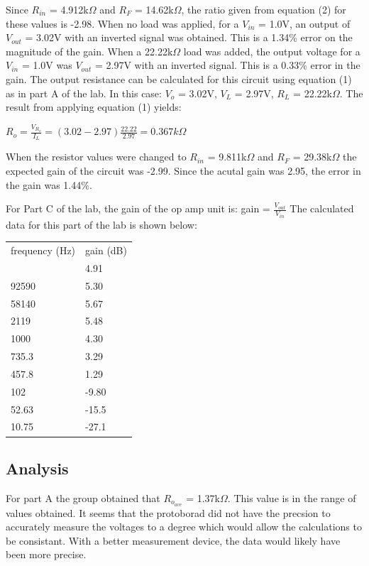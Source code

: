 \documentclass[twocolumn, amsmath]{revtex4}
\begin{document}
Since $R_{in}$ = 4.912k$\Omega$ and $R_{F}$ = 14.62k$\Omega$, the ratio given from equation (2) for these values is -2.98. When no load was applied, for a $V_{in}$ = 1.0V, an output of $V_{out}$ = 3.02V with an inverted signal was obtained. This is a 1.34\% error on the magnitude of the gain. When a 22.22k$\Omega$ load was added, the output voltage for a $V_{in}$ = 1.0V was $V_{out}$ = 2.97V with an inverted signal. This is a 0.33\% error in the gain. The output resistance can be calculated for this circuit using equation (1) as in part A of the lab. In this case: $V_{o}$ = 3.02V, $V_{L}$ = 2.97V, $R_{L}$ = 22.22k$\Omega$. The result from applying equation (1) yields: 

$R_{o} =  \frac{V_{R_{o}}}{I_{L}} = (3.02 - 2.97)\frac{22.22}{2.97} = 0.367k\Omega$

When the resistor values were changed to $R_{in}$ = 9.811k$\Omega$ and $R_{F}$ = 29.38k$\Omega$ the expected gain of the circuit was -2.99. Since the acutal gain was 2.95, the error in the gain was 1.44\%. 

For Part C of the lab, the gain of the op amp unit is: gain = $\frac{V_{out}}{V_{in}}$ The calculated data for this part of the lab is shown below:

\begin{center}
	\begin{ruledtabular}
    \begin{tabular}{ l l }
	frequency (Hz) & gain (dB) \\ \colrule
	102000 & 4.91 \\
	92590 & 5.30  \\
	58140 & 5.67 \\
	2119 & 5.48 \\
	1000 & 4.30 \\
	735.3 & 3.29 \\
	457.8 & 1.29 \\
	102 & -9.80 \\
	52.63 & -15.5 \\
	10.75 & -27.1 \\
\end{tabular}
    \end{ruledtabular}
\end{center}



\subsection{Analysis}
For part A the group obtained that $R_{o_{ave}}$ = 1.37k$\Omega$. This value is in the range of values obtained. It seems that the protoborad did not have the precsion to accurately measure the voltages to a degree which would allow the calculations to be consistant. With a better measurement device, the data would likely have been more precise.
\end{document}
